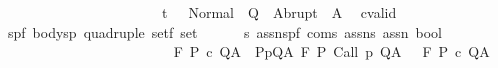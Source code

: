 \begin{isabellebody}
\ \ \ \ \ \ \ \ \ \ \ \ \ \ \ \ \ \ \ \ \ \ {\isasymlongrightarrow}\ \ t\ {\isasymin}\ \ Normal\ {\isacharbackquote}\ Q\ {\isasymunion}\ Abrupt\ {\isacharbackquote}\ A{\isachardoublequoteclose}\isanewline
\isanewline
{}\isamarkupfalse%
\isanewline
\ \ cvalid{\isacharcolon}{\isacharcolon}\isanewline
\ \ {\isachardoublequoteopen}{\isacharbrackleft}{\isacharparenleft}{\isacharprime}s{\isacharcomma}{\isacharprime}p{\isacharcomma}{\isacharprime}f{\isacharparenright}\ body{\isacharcomma}{\isacharparenleft}{\isacharprime}s{\isacharcomma}{\isacharprime}p{\isacharparenright}\ quadruple\ set{\isacharcomma}{\isacharprime}f\ set{\isacharcomma}\isanewline
\ \ \ \ \ \ {\isacharprime}s\ assn{\isacharcomma}{\isacharparenleft}{\isacharprime}s{\isacharcomma}{\isacharprime}p{\isacharcomma}{\isacharprime}f{\isacharparenright}\ com{\isacharcomma}{\isacharprime}s\ assn{\isacharcomma}{\isacharprime}s\ assn{\isacharbrackright}\ {\isacharequal}{\isachargreater}bool{\isachardoublequoteclose}\isanewline
\ \ \ \ \ \ \ \ \ \ \ \ \ \ \ \ {\isacharparenleft}{\isachardoublequoteopen}{\isacharunderscore}{\isacharcomma}{\isacharunderscore}{\isasymTurnstile}\isactrlbsub {\isacharprime}{\isacharslash}{\isacharunderscore}\isactrlesub {\isacharslash}\ {\isacharunderscore}\ {\isacharunderscore}\ {\isacharunderscore}{\isacharcomma}{\isacharunderscore}{\isachardoublequoteclose}\ \ {\isacharbrackleft}{}{}{\isacharcomma}{}{}{\isacharcomma}{}{}{\isacharcomma}{}{}{}{}{\isacharcomma}\ {}{}{\isacharcomma}\ {}{}{}{}{\isacharcomma}{}{}{}{}{\isacharbrackright}\ {}{}{\isacharparenright}\isanewline
{}\isanewline
\ {\isachardoublequoteopen}{\isasymGamma}{\isacharcomma}{\isasymTheta}{\isasymTurnstile}\isactrlbsub {\isacharslash}F\isactrlesub \ P\ c\ Q{\isacharcomma}A\ {\isasymequiv}\ {\isacharparenleft}{\isasymforall}{\isacharparenleft}P{\isacharcomma}p{\isacharcomma}Q{\isacharcomma}A{\isacharparenright}{\isasymin}{\isasymTheta}{\isachardot}\ {\isasymGamma}{\isasymTurnstile}\isactrlbsub {\isacharslash}F\isactrlesub \ P\ {\isacharparenleft}Call\ p{\isacharparenright}\ Q{\isacharcomma}A{\isacharparenright}\ {\isasymlongrightarrow}\ {\isasymGamma}\ {\isasymTurnstile}\isactrlbsub {\isacharslash}F\isactrlesub \ P\ c\ Q{\isacharcomma}A{\isachardoublequoteclose}\isanewline
\isanewline
\isanewline
{}\isamarkupfalse%

\end{isabellebody}
